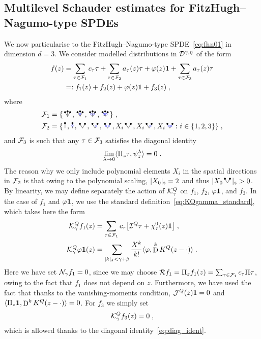 \documentclass[reqno,11pt]{article}
\def\unit{\vone}
\def\fraks{\mathfrak{s}}
\def\abss#1{\abs{#1}_\mathfrak{s}}
\DeclareMathOperator{\D}{D}            %
\begin{document}

\subsection{Multilevel Schauder estimates for FitzHugh--Nagumo-type SPDEs}

We now particularise to the FitzHugh--Nagumo-type SPDE~\eqref{eq:fhn01} in
dimension $d=3$. We consider modelled distributions in
${\mathcal D}^{\gamma,\eta}$ of the form 
\begin{align}
\nonumber
 f(z) &= \sum_{\tau\in\cF_1} c_\tau \tau 
 + \sum_{\tau\in\cF_2} a_\tau(z) \tau 
 + \varphi(z)\unit
 + \sum_{\tau\in\cF_3} a_\tau(z) \tau \\
 &=: f_1(z) + f_2(z) + \varphi(z)\unit + f_3(z)\;,
\label{eq:f123} 
\end{align} 
where
\begin{align}
\nonumber
\cF_1 &= \set{\RSW,\RSWo,\RSWoo,\RSWooo}\;, \\
\cF_2 &= \set{\RSI,\RSoI,\RSV,\RSVo,\RSVoo,
X_i\RSV,X_i\RSVo,X_i\RSVoo\colon i\in\set{1,2,3}}\;,
\label{eq:tauset_KQ} 
\end{align}
and ${\mathcal F}_3$ is such that any $\tau\in{\mathcal F}_3$ satisfies the diagonal identity
\begin{equation}
\label{eq:diag_ident} 
\lim_{\lambda\to0} \pscal{\Pi_z\tau}{\psi^\lambda_z} = 0\;.
\end{equation} 
The reason why we only include polynomial elements $X_i$ in the 
spatial directions in ${\mathcal F}_2$ is that owing to the polynomial scaling, 
$\abs{X_0}_\fraks=2$ and thus $\abs{X_0{\protect\RSV}}_\fraks>0$. 
By linearity, we may define separately the action of ${\mathcal K}^Q_\gamma$ on $f_1$,
$f_2$, $\varphi\unit$, and $f_3$. In the case of $f_1$ and $\varphi\unit$, we
use the standard definition~\eqref{eq:KQgamma_standard}, which takes here the
form
\begin{align}
\cK^Q_\gamma f_1(z) &= \sum_{\tau\in\cF_1} 
c_\tau\bigbrak{\cI^Q\tau + \chi^0_\tau(z)\unit}\;, \\
\cK^Q_\gamma \varphi\unit(z) &= 
\sum_{\abss{k} < \gamma+\beta} \frac{X^k}{k!}
\pscal{ \varphi}{\D^k K^Q(z-\cdot)}
\;.
\end{align}
Here we have set ${\mathcal N}_\gamma f_1 = 0$, since we may choose 
${\mathcal R} f_1 = \Pi_z f_1(z) = \sum_{\tau\in{\mathcal F}_1}c_\tau\Pi\tau$, owing to the fact
that $f_1$ does not depend on $z$.
Furthermore, we have used the fact that thanks 
to the vanishing-moments condition, $\cJ^Q(z)\unit=0$ and 
$\pscal{\Pi_z\unit}{\D^k K^Q(z-\cdot)}=0$.
For $f_3$ we simply set 
\begin{equation}
 {\mathcal K}^Q_\gamma f_3(z) = 0\;,
\end{equation} 
which is allowed thanks to the diagonal identity~\eqref{eq:diag_ident}.
\end{document}
